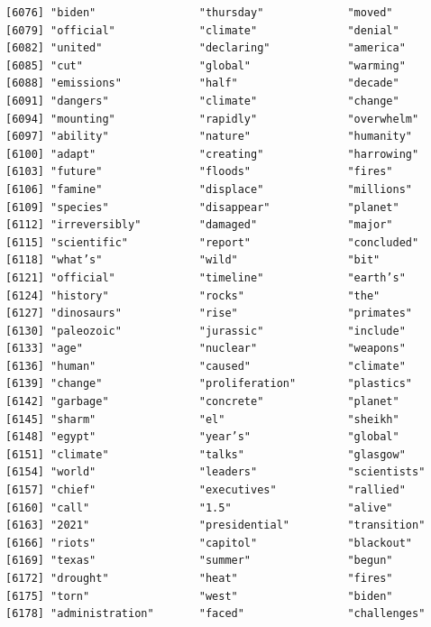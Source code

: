 \documentclass[
  letterpaper,
  DIV=11,
  numbers=noendperiod]{scrartcl}
\begin{document}
\begin{verbatim}
[6076] "biden"                "thursday"             "moved"               
[6079] "official"             "climate"              "denial"              
[6082] "united"               "declaring"            "america"             
[6085] "cut"                  "global"               "warming"             
[6088] "emissions"            "half"                 "decade"              
[6091] "dangers"              "climate"              "change"              
[6094] "mounting"             "rapidly"              "overwhelm"           
[6097] "ability"              "nature"               "humanity"            
[6100] "adapt"                "creating"             "harrowing"           
[6103] "future"               "floods"               "fires"               
[6106] "famine"               "displace"             "millions"            
[6109] "species"              "disappear"            "planet"              
[6112] "irreversibly"         "damaged"              "major"               
[6115] "scientific"           "report"               "concluded"           
[6118] "what’s"               "wild"                 "bit"                 
[6121] "official"             "timeline"             "earth’s"             
[6124] "history"              "rocks"                "the‌"                 
[6127] "dinosaurs"            "rise"                 "primates"            
[6130] "paleozoic"            "jurassic"             "include"             
[6133] "age"                  "nuclear"              "weapons"             
[6136] "human"                "caused"               "climate"             
[6139] "change"               "proliferation"        "plastics"            
[6142] "garbage"              "concrete"             "planet"              
[6145] "sharm"                "el"                   "sheikh"              
[6148] "egypt"                "year’s"               "global"              
[6151] "climate"              "talks"                "glasgow"             
[6154] "world"                "leaders"              "scientists"          
[6157] "chief"                "executives"           "rallied"             
[6160] "call"                 "1.5"                  "alive"               
[6163] "2021"                 "presidential"         "transition"          
[6166] "riots"                "capitol"              "blackout"            
[6169] "texas"                "summer"               "begun"               
[6172] "drought"              "heat"                 "fires"               
[6175] "torn"                 "west"                 "biden"               
[6178] "administration"       "faced"                "challenges"          

\end{verbatim}
\end{document}
